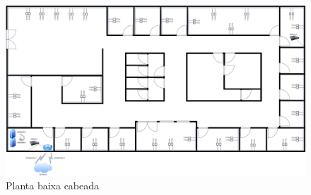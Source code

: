 \documentclass[	DIV=calc,%
							paper=a4,%
							fontsize=12pt,%
							onecolumn]{scrartcl}	 					%
\begin{document}
\begin{figure}
	\includegraphics[height=\textwidth,angle=-90,scale=0.8]{planta2d_cabeada}
	\caption{Planta baixa cabeada}
	\label{planta2d_cabeada}
\end{figure}
\end{document}
